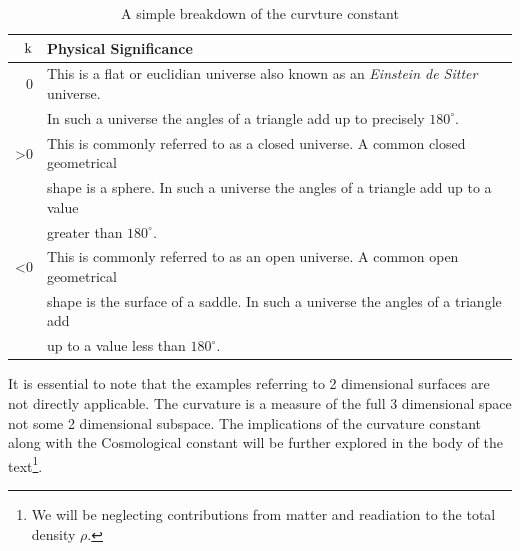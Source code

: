 \documentclass[twoside]{article}
\begin{document}
\begin{table}[h!]
  \begin{center}
    \begin{tabular}{ r | l }
    \hline\hline
    $\boldsymbol{$k$}$ & \textbf{Physical Significance}   \\\hline\hline
    0 & This is a flat or euclidian universe also known as an \emph{Einstein de Sitter} universe.\\& In such a universe the angles of a triangle add up to precisely $180^{\circ}$.\\\hline
    >0 & This is commonly referred to as a closed universe. A common closed geometrical\\& shape is a sphere. In such a universe the angles of a triangle add up to a value\\& greater than $180^{\circ}$.\\\hline
    <0 & This is commonly referred to as an open universe. A common open geometrical\\& shape is the surface of a saddle. In such a universe the angles of a triangle add\\& up to a value less than $180^{\circ}$. \\
    \hline
    \end{tabular}
  \end{center}
  \caption{A simple breakdown of the curvture constant}\label{t:curvature}
\end{table}
It is essential to note that the examples referring to 2 dimensional surfaces are not directly applicable. The curvature is a measure of the full 3 dimensional  space not some 2 dimensional subspace. The implications of the curvature constant along with the Cosmological constant will be further explored in the body of the text\footnote{We will be neglecting contributions from matter and readiation to the total density $\rho$.}.
\end{document}

